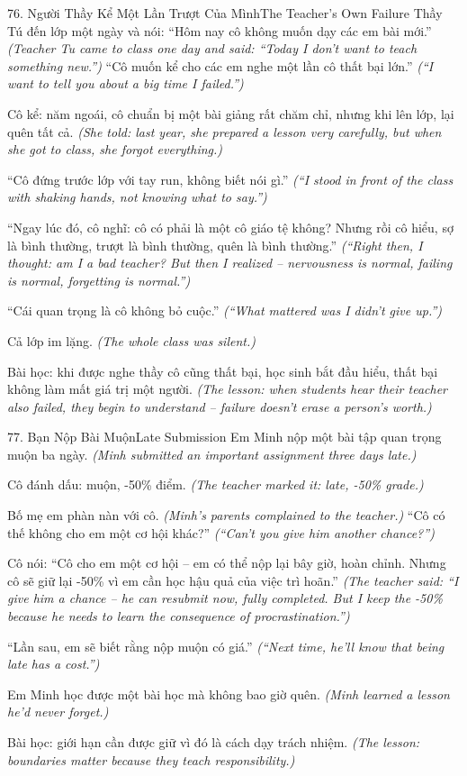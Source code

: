 \begin{truyen}{76. Người Thầy Kể Một Lần Trượt Của Mình}{The Teacher's Own Failure}
Thầy Tú đến lớp một ngày và nói: ``Hôm nay cô không muốn dạy các em bài mới.''
\textit{(Teacher Tu came to class one day and said: ``Today I don't want to teach something new.'')}
``Cô muốn kể cho các em nghe một lần cô thất bại lớn.''
\textit{(``I want to tell you about a big time I failed.'')}

Cô kể: năm ngoái, cô chuẩn bị một bài giảng rất chăm chỉ, nhưng khi lên lớp, lại quên tất cả.
\textit{(She told: last year, she prepared a lesson very carefully, but when she got to class, she forgot everything.)}

``Cô đứng trước lớp với tay run, không biết nói gì.''
\textit{(``I stood in front of the class with shaking hands, not knowing what to say.'')}

``Ngay lúc đó, cô nghĩ: cô có phải là một cô giáo tệ không? Nhưng rồi cô hiểu, sợ là bình thường, trượt là bình thường, quên là bình thường.''
\textit{(``Right then, I thought: am I a bad teacher? But then I realized -- nervousness is normal, failing is normal, forgetting is normal.'')}

``Cái quan trọng là cô không bỏ cuộc.''
\textit{(``What mattered was I didn't give up.'')}

Cả lớp im lặng.
\textit{(The whole class was silent.)}

Bài học: khi được nghe thầy cô cũng thất bại, học sinh bắt đầu hiểu, thất bại không làm mất giá trị một người.
\textit{(The lesson: when students hear their teacher also failed, they begin to understand -- failure doesn't erase a person's worth.)}
\end{truyen}

\begin{truyen}{77. Bạn Nộp Bài Muộn}{Late Submission}
Em Minh nộp một bài tập quan trọng muộn ba ngày.
\textit{(Minh submitted an important assignment three days late.)}

Cô đánh dấu: muộn, -50\% điểm.
\textit{(The teacher marked it: late, -50\% grade.)}

Bố mẹ em phàn nàn với cô.
\textit{(Minh's parents complained to the teacher.)}
``Cô có thế không cho em một cơ hội khác?''
\textit{(``Can't you give him another chance?'')}

Cô nói: ``Cô cho em một cơ hội -- em có thể nộp lại bây giờ, hoàn chỉnh. Nhưng cô sẽ giữ lại -50\% vì em cần học hậu quả của việc trì hoãn.''
\textit{(The teacher said: ``I give him a chance -- he can resubmit now, fully completed. But I keep the -50\% because he needs to learn the consequence of procrastination.'')}

``Lần sau, em sẽ biết rằng nộp muộn có giá.''
\textit{(``Next time, he'll know that being late has a cost.'')}

Em Minh học được một bài học mà không bao giờ quên.
\textit{(Minh learned a lesson he'd never forget.)}

Bài học: giới hạn cần được giữ vì đó là cách dạy trách nhiệm.
\textit{(The lesson: boundaries matter because they teach responsibility.)}
\end{truyen}

